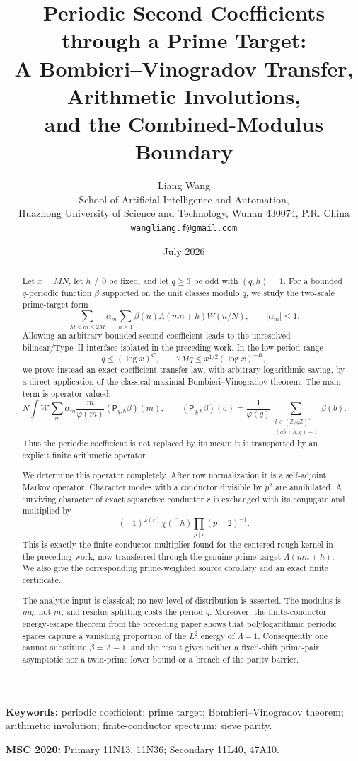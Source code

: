 \documentclass[11pt]{article}
\title{\textbf{Periodic Second Coefficients through a Prime Target:}\\
\textbf{A Bombieri--Vinogradov Transfer,}\\
\textbf{Arithmetic Involutions,}\\
\textbf{and the Combined-Modulus Boundary}}
\author{Liang Wang\\
\small School of Artificial Intelligence and Automation,\\[-0.2em]
\small Huazhong University of Science and Technology, Wuhan 430074, P.R. China\\
\small \texttt{wangliang.f@gmail.com}}
\date{July 2026}
\theoremstyle{definition}
\theoremstyle{remark}
\newcommand{\Z}{\mathbb Z}
\begin{document}
\maketitle

\begin{abstract}
Let $x=MN$, let $h\ne0$ be fixed, and let $q\geq3$ be odd with
$(q,h)=1$.  For a bounded $q$-periodic function $\beta$ supported on the
unit classes modulo $q$, we study the two-scale prime-target form
\[
 \sum_{M<m\leq2M}\alpha_m
 \sum_{n\geq1}\beta(n)\Lambda(mn+h)W(n/N),
 \qquad |\alpha_m|\leq1.
\]
Allowing an arbitrary bounded second coefficient leads to the unresolved
bilinear/Type~II interface isolated in the preceding work.  In the
low-period range
\[
 q\leq(\log x)^C,
 \qquad
 2Mq\leq x^{1/2}(\log x)^{-B},
\]
we prove instead an exact coefficient-transfer law, with arbitrary logarithmic
saving, by a direct application of the classical maximal
Bombieri--Vinogradov theorem.  The main term is operator-valued:
\[
 N\!\int W\,
 \sum_m\alpha_m\frac{m}{\varphi(m)}
 (\mathsf P_{q,h}\beta)(m),
 \qquad
 (\mathsf P_{q,h}\beta)(a)
 =\frac1{\varphi(q)}
 \sum_{\substack{b\in(\Z/q\Z)^\times\\(ab+h,q)=1}}\beta(b).
\]
Thus the periodic coefficient is not replaced by its mean: it is transported
by an explicit finite arithmetic operator.

We determine this operator completely.  After row normalization it is a
self-adjoint Markov operator.  Character modes with a conductor divisible by
$p^2$ are annihilated.  A surviving character of exact squarefree conductor
$r$ is exchanged with its conjugate and multiplied by
\[
 (-1)^{\omega(r)}\overline{\chi(-h)}
 \prod_{p\mid r}(p-2)^{-1}.
\]
This is exactly the finite-conductor multiplier found for the centered rough
kernel in the preceding work, now transferred through the genuine prime
target $\Lambda(mn+h)$.  We also give the corresponding prime-weighted source
corollary and an exact finite certificate.

The analytic input is classical; no new level of distribution is asserted.
The modulus is $mq$, not $m$, and residue splitting costs the period $q$.
Moreover, the finite-conductor energy-escape theorem from the preceding paper
shows that polylogarithmic periodic spaces capture a vanishing proportion of
the $L^2$ energy of $\Lambda-1$.  Consequently one cannot substitute
$\beta=\Lambda-1$, and the result gives neither a fixed-shift prime-pair
asymptotic nor a twin-prime lower bound or a breach of the parity barrier.
\end{abstract}

\noindent\textbf{Keywords:} periodic coefficient; prime target;
Bombieri--Vinogradov theorem; arithmetic involution; finite-conductor
spectrum; sieve parity.

\medskip
\noindent\textbf{MSC 2020:} Primary 11N13, 11N36; Secondary 11L40, 47A10.










\end{document}
